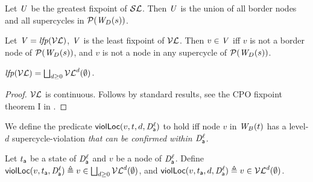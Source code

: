 \begin{proposition} \label{prop:GFPisLargestLocSC}
Let $\UU$ be the greatest fixpoint of $\lSFs$. Then $\UU$ is the union of all border nodes and all supercycles in 
$\lwfgS{B}{s}{\DS}$.
\end{proposition}

\begin{proposition} \label{prop:LFPisLocScViolations}
Let  $\VS= \lfp{\lVFs}$, \ie $\VS$ is the least fixpoint of $\lVFs$. Then $v \in \VS$ iff $v$ is not a border node of 
$\lwfgS{B}{s}{\DS}$, and $v$ is not a node in any supercycle of $\lwfgS{B}{s}{\DS}$.
\end{proposition}

\begin{proposition} \label{prop:computeLocLFP}
$\lfp{\lVFs} = \JOIN_{d \ge 0} \lVFs^{d} (\ewfg)$.
\end{proposition}
%
\begin{proof}
$\lVFs$ is continuous. Follows by standard results, \eg see the CPO fixpoint theorem I in 
\cite{DP02}.
\end{proof}










We define the predicate $\lviol{v}{d}{t}{\act}{\l}$ to hold iff node $v$ in $\wfg{B}{t}$ has a level-$d$ supercycle-violation
\emph{that can be confirmed within $\dsk{\act}{\l}$}.

\begin{definition}
\label{def:supercycle.violation.local}
Let $t_\act$ be a state of $\dsk{\act}{\l}$ and $v$ be a node of $\dsk{\act}{\l}$.
Define 
$\scVL{v}{t_\act}{\act}{\l} \df v \in \JOIN_{d \ge 0} \lVFs^{d} (\ewfg)$, and 
$\lviol{v}{d}{t_\act}{\act}{\l} \df v \in \lVFs^{d} (\ewfg)$.
\end{definition}






